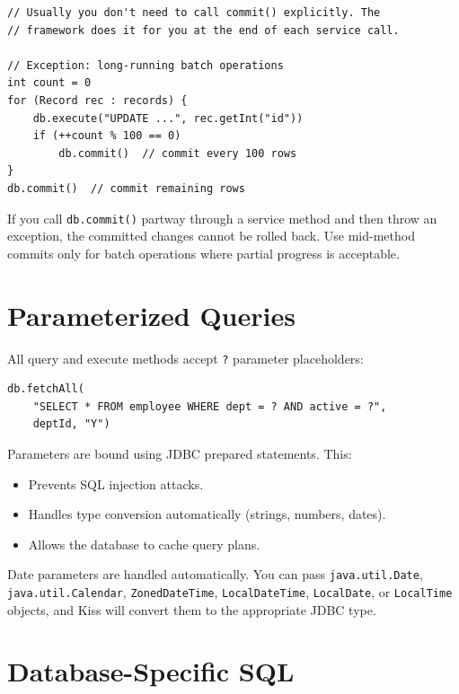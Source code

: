 \begin{lstlisting}[style=groovy]
// Usually you don't need to call commit() explicitly. The
// framework does it for you at the end of each service call.

// Exception: long-running batch operations
int count = 0
for (Record rec : records) {
    db.execute("UPDATE ...", rec.getInt("id"))
    if (++count % 100 == 0)
        db.commit()  // commit every 100 rows
}
db.commit()  // commit remaining rows
\end{lstlisting}

\begin{warnbox}
If you call \texttt{db.commit()} partway through a service method and then throw an exception, the committed changes cannot be rolled back.  Use mid-method commits only for batch operations where partial progress is acceptable.
\end{warnbox}

\section{Parameterized Queries}
\label{sec:db-params}

All query and execute methods accept \texttt{?} parameter placeholders:

\begin{lstlisting}[style=groovy]
db.fetchAll(
    "SELECT * FROM employee WHERE dept = ? AND active = ?",
    deptId, "Y")
\end{lstlisting}

\noindent
Parameters are bound using JDBC prepared statements.  This:

\begin{itemize}
  \item Prevents SQL injection attacks.
  \item Handles type conversion automatically (strings, numbers, dates).
  \item Allows the database to cache query plans.
\end{itemize}

\noindent
Date parameters are handled automatically.  You can pass \texttt{java.util.Date}, \texttt{java.util.Calendar}, \texttt{ZonedDateTime}, \texttt{LocalDateTime}, \texttt{LocalDate}, or \texttt{LocalTime} objects, and Kiss will convert them to the appropriate JDBC type.

\section{Database-Specific SQL}
\label{sec:db-specific}

